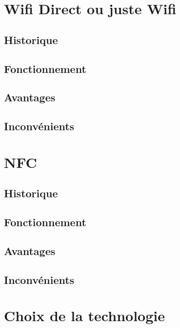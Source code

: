 \documentclass[a4paper,10pt]{report}
\begin{document}
  \section{Wifi Direct ou juste Wifi} 
    \subsection{Historique}
    \subsection{Fonctionnement}
    \subsection{Avantages}
    \subsection{Inconvénients}
  \section{NFC}
    \subsection{Historique}
    \subsection{Fonctionnement}
    \subsection{Avantages}
    \subsection{Inconvénients}
  \section{Choix de la technologie}
  
\end{document}
